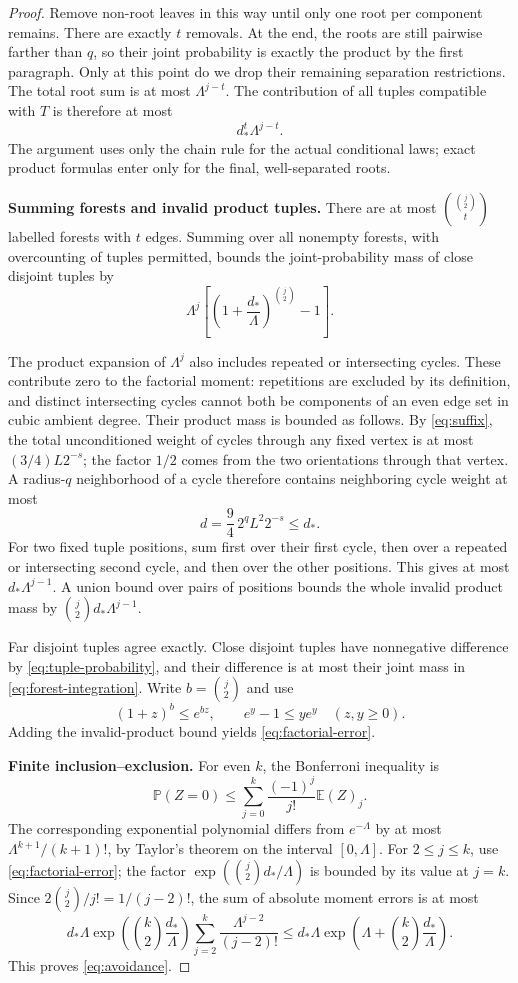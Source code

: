 \documentclass[11pt,a4paper]{article}
\numberwithin{equation}{section}
\theoremstyle{definition}
\theoremstyle{remark}
\newcommand{\E}{\mathbb E}
\newcommand{\Prob}{\mathbb P}
\newcommand{\proofstep}[1]{\par\addvspace{\medskipamount}\noindent\textbf{#1}\enspace\ignorespaces}
\begin{document}
\begin{proof}
Remove non-root leaves in this way until only one root per component remains. There are exactly $t$ removals. At the end, the roots are still pairwise farther than $q$, so their joint probability is exactly the product by the first paragraph. Only at this point do we drop their remaining separation restrictions. The total root sum is at most $\Lambda^{j-t}$. The contribution of all tuples compatible with $T$ is therefore at most
\[
 d_*^t\Lambda^{j-t}.
\]
The argument uses only the chain rule for the actual conditional laws; exact product formulas enter only for the final, well-separated roots.

\proofstep{Summing forests and invalid product tuples.}
There are at most $\binom{\binom j2}{t}$ labelled forests with $t$ edges. Summing over all nonempty forests, with overcounting of tuples permitted, bounds the joint-probability mass of close disjoint tuples by
\begin{equation}\label{eq:forest-integration}
 \Lambda^j\left[\left(1+\frac{d_*}{\Lambda}\right)^{\binom j2}-1\right].
\end{equation}

The product expansion of $\Lambda^j$ also includes repeated or intersecting cycles. These contribute zero to the factorial moment: repetitions are excluded by its definition, and distinct intersecting cycles cannot both be components of an even edge set in cubic ambient degree. Their product mass is bounded as follows. By \eqref{eq:suffix}, the total unconditioned weight of cycles through any fixed vertex is at most $(3/4)L2^{-s}$; the factor $1/2$ comes from the two orientations through that vertex. A radius-$q$ neighborhood of a cycle therefore contains neighboring cycle weight at most
\[
 d=\frac94\,2^qL^2 2^{-s}\le d_*.
\]
For two fixed tuple positions, sum first over their first cycle, then over a repeated or intersecting second cycle, and then over the other positions. This gives at most $d_*\Lambda^{j-1}$. A union bound over pairs of positions bounds the whole invalid product mass by $\binom j2d_*\Lambda^{j-1}$.

Far disjoint tuples agree exactly. Close disjoint tuples have nonnegative difference by \eqref{eq:tuple-probability}, and their difference is at most their joint mass in \eqref{eq:forest-integration}. Write $b=\binom j2$ and use
\[
 (1+z)^b\le e^{bz},\qquad e^y-1\le ye^y\quad(z,y\ge0).
\]
Adding the invalid-product bound yields \eqref{eq:factorial-error}.

\proofstep{Finite inclusion--exclusion.}
For even $k$, the Bonferroni inequality is
\[
 \Prob(Z=0)\le\sum_{j=0}^{k}\frac{(-1)^j}{j!}\E(Z)_j.
\]
The corresponding exponential polynomial differs from $e^{-\Lambda}$ by at most $\Lambda^{k+1}/(k+1)!$, by Taylor's theorem on the interval $[0,\Lambda]$. For $2\le j\le k$, use \eqref{eq:factorial-error}; the factor $\exp(\binom j2d_*/\Lambda)$ is bounded by its value at $j=k$. Since $2\binom j2/j!=1/(j-2)!$, the sum of absolute moment errors is at most
\[
 d_*\Lambda\exp\left(\binom k2\frac{d_*}{\Lambda}\right)
 \sum_{j=2}^{k}\frac{\Lambda^{j-2}}{(j-2)!}
 \le d_*\Lambda\exp\left(\Lambda+\binom k2\frac{d_*}{\Lambda}\right).
\]
This proves \eqref{eq:avoidance}.
\end{proof}
\end{document}
